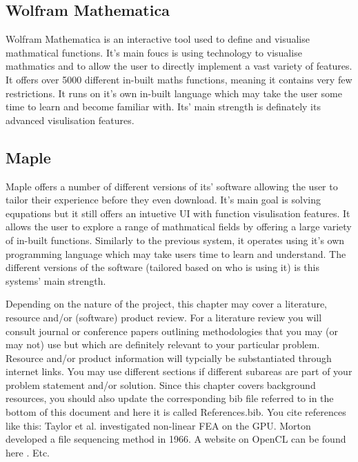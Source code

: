 \documentclass[a4paper, oneside, 11pt]{report}
\begin{document}
\subsection{Wolfram Mathematica\cite{Mathematica}}

Wolfram Mathematica is an interactive tool used to define and visualise mathmatical functions. It's main foucs is using technology to visualise mathmatics and to allow the user to directly implement a vast variety of features. It offers over 5000 different in-built maths functions, meaning it contains very few restrictions. It runs on it's own in-built language which may take the user some time to learn and become familiar with. Its' main strength is definately its advanced visulisation features.

\subsection{Maple\cite{Maple}}

Maple offers a number of different versions of its' software allowing the user to tailor their experience before they even download. It's main goal is solving equpations but it still offers an intuetive UI with function visulisation features. It allows the user to explore a range of mathmatical fields by offering a large variety of in-built functions. Similarly to the previous system, it operates using it's own programming language which may take users time to learn and understand. The different versions of the software (tailored based on who is using it) is this systems' main strength.

Depending on the nature of the project, this chapter may cover a literature, resource and/or (software) product review. For a literature review you will consult journal or conference papers outlining methodologies that you may (or may not) use but which are definitely relevant to your particular problem. Resource and/or product information will typcially be substantiated through internet links. 
You may use different sections if different subareas are part of your problem statement and/or solution. 
Since this chapter covers background resources, you should also update the corresponding bib file referred to in the bottom of this document and here it is called References.bib.
You cite references like this: Taylor et al. \cite{Taylor:2007} investigated non-linear FEA on the GPU. Morton \cite{Morton:1966} developed a file sequencing method in 1966. A website on OpenCL can be found here \cite{Soos:2012}. Etc.
\end{document}
